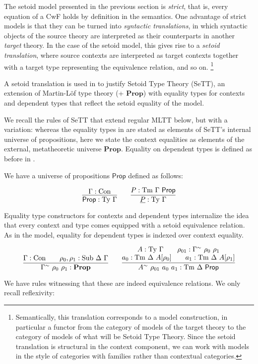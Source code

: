 \documentclass{easychair}
\newcommand{\GG}{\Gamma}
\newcommand{\DD}{\Delta}
\newcommand{\subj}[3]{#1 : \mathrm{Sub}\ #2\ #3}
\newcommand{\Prop}{\textsf{Prop}}
\newcommand{\mProp}{\mathbf{Prop}}
\newcommand{\Con}{\mathrm{Con}}
\newcommand{\Ty}{\mathrm{Ty}}
\newcommand{\Tm}{\mathrm{Tm}}
\newcommand{\metaprop}{\mathbf{Prop}}
\begin{document}
The setoid model presented in the previous section is \emph{strict}, that is,
every equation of a CwF holds by definition in the semantics. One advantage of
strict models is that they can be turned into \emph{syntactic translations}, in
which syntactic objects of the source theory are interpreted as their
counterparts in another \emph{target} theory. In the case of the setoid model,
this gives rise to a \emph{setoid translation}, where source contexts are
interpreted as target contexts together with a target type representing the
equivalence relation, and so on.
\footnote{%
Semantically, this translation corresponds to a model construction, in
particular a functor from the category of models of the target theory to the
category of models of what will be Setoid Type Theory.  Since the setoid
translation is structural in the context component, we can work with models in
the style of categories with families rather than contextual categories.
}

A setoid translation is used in \cite{mpc19} to justify Setoid Type Theory
(SeTT), an extension of Martin-L\"of type theory (+ $\mProp$) with equality
types for contexts and dependent types that reflect the setoid equality of the
model.

We recall the rules of SeTT that extend regular MLTT below, but with a
variation: whereas the equality types in \cite{mpc19} are stated as elements of
SeTT's internal universe of propositions, here we state the context equalities
as elements of the external, metatheoretic universe $\mProp$. Equality on
dependent types is defined as before in \cite{mpc19}.

We have a universe of propositions $\Prop$ defined as follows:

\[
\infer{
  \Prop : \Ty\ \GG
}{
  \GG : \Con
}
\qquad
\infer{
  \underline{P} : \Ty\ \GG
}{
  P : \Tm\ \GG\ \Prop
}
\]

Equality type constructors for contexts and dependent types internalize the idea
that every context and type comes equipped with a setoid equivalence
relation. As in the model, equality for dependent types is indexed over context
equality.

\[
\infer{
  \GG^\sim\ \rho_0\ \rho_1 : \metaprop
}{
  \GG : \Con \qquad \subj{\rho_0, \rho_1}{\DD}{\GG}
}
\qquad
\infer{
  A^{\sim}\ \rho_{01}\ a_0\ a_1 : \Tm\ \DD\ \Prop
}{
  \deduce{
    a_0 : \Tm\ \DD\ A[\rho_0] \qquad a_1 : \Tm\ \DD\ A[\rho_1]
  }{
    A : \Ty\ \GG \qquad \rho_{01} : \GG^{\sim}\ \rho_0\ \rho_1
  }
}
\]

We have rules witnessing that these are indeed equivalence relations. We only
recall reflexivity:
\end{document}
